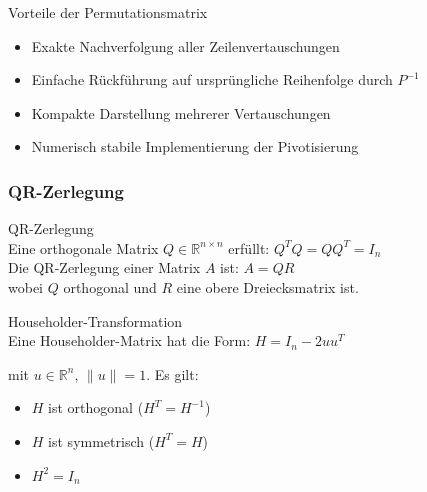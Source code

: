 \begin{concept}{Vorteile der Permutationsmatrix}
    \begin{itemize}
        \item Exakte Nachverfolgung aller Zeilenvertauschungen
        \item Einfache Rückführung auf ursprüngliche Reihenfolge durch $P^{-1}$
        \item Kompakte Darstellung mehrerer Vertauschungen
        \item Numerisch stabile Implementierung der Pivotisierung
    \end{itemize}
\end{concept}

\columnbreak

\subsubsection{QR-Zerlegung}

\begin{concept}{QR-Zerlegung}\\
Eine orthogonale Matrix $Q \in \mathbb{R}^{n\times n}$ erfüllt: $Q^T Q = QQ^T = I_n$
\vspace{1mm}\\
Die QR-Zerlegung einer Matrix $A$ ist: $A = QR$
\vspace{1mm}\\
wobei $Q$ orthogonal und $R$ eine obere Dreiecksmatrix ist.
\end{concept}

\begin{definition}{Householder-Transformation}\\
Eine Householder-Matrix hat die Form:
$H = I_n - 2uu^T$

mit $u \in \mathbb{R}^n$, $\|u\| = 1$. Es gilt:
\begin{itemize}
    \item $H$ ist orthogonal ($H^T = H^{-1}$)
    \item $H$ ist symmetrisch ($H^T = H$)
    \item $H^2 = I_n$
\end{itemize}
\end{definition}

